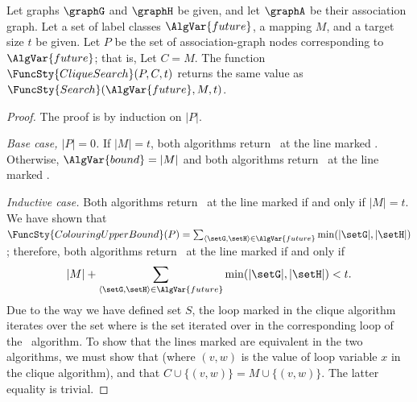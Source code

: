 \begin{theorem}\label{cliqueMcSplitProp}
    Let graphs $\graphG$ and $\graphH$ be given, and let $\graphA$ be their association graph.
    Let a set of label classes $\AlgVar{future}$, a mapping $M$, and a target size $t$ be given.
    Let $P$ be the set of association-graph nodes corresponding to $\AlgVar{future}$; that is,
    Let $C = M$.
    The function $\FuncSty{CliqueSearch}(P,C,t)$ returns the same value as
    $\FuncSty{Search}(\AlgVar{future},M,t)$.
\end{theorem}
\begin{proof}
  The proof is by induction on $|P|$.

  \emph{Base case, $|P|=0$.} If $|M| = t$, both algorithms return \boolT\ at
    the line marked .  Otherwise, $\AlgVar{bound} = |M|$ and both
    algorithms return \boolF\ at the line marked .

  \emph{Inductive case.} Both algorithms return \boolT\ at the line marked
     if and only if $|M|=t$.  We have shown that $\FuncSty{ColouringUpperBound}(P) =
    \sum_{\langle \setG,\setH \rangle \in \AlgVar{future}} \min(|\setG|,|\setH|)$; therefore,
    both algorithms return \boolF\ at the line marked  if and only
    if 
\[
    |M| + \sum_{\langle \setG,\setH \rangle \in \AlgVar{future}} \min(|\setG|,|\setH|) < t.
\]
    Due to the way we have defined set $S$, the loop marked  in the clique
    algorithm iterates over the set
    where
    \DIFadd{$\setH$}
    is the set
    iterated over in the corresponding loop of the \McSplit\ algorithm.  To show that the lines
    marked  are equivalent in the two algorithms, we must show that
    (where $(v,w)$ is the value of loop variable $x$ in the clique algorithm), and that
    $C \cup \{(v,w)\} = M \cup \{(v,w)\}$.  The latter equality is trivial.


\end{proof}
